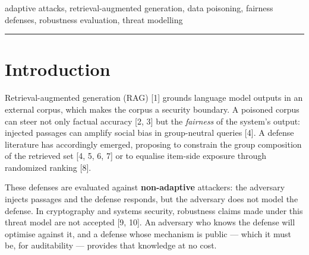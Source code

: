 \documentclass[review,3p,times]{elsarticle}
\begin{document}
\begin{abstract}
\begin{enumerate}
\item
  \textbf{A partial exception, and its limits.} Only the R2 (within-group stance) constraint retains measurable benefit under adaptation, and only at low perturbation strength: on BBQ it holds adversarial inclusion at 0.049--0.319 up to \(\lambda = 0.5\), versus 0.007--0.111 for off-manifold filtering, and it does so while preserving utility. Above \(\lambda = 2\) every defense saturates at 1.000.
\end{enumerate}

The practical implication is that adaptive evaluation changes the conclusion of this literature: static rankings of defense strength are not merely optimistic but \emph{inverted}. We propose a minimal reporting protocol --- an adaptive attacker with a strength sweep --- and argue it should be mandatory for any retrieval-fairness defense claim.

\end{abstract}

\begin{keyword}
 adaptive attacks, retrieval-augmented generation, data poisoning, fairness defenses, robustness evaluation, threat modelling

\begin{center}\rule{0.5\linewidth}{0.5pt}\end{center}

\end{keyword}

\section{Introduction}\label{introduction}

Retrieval-augmented generation (RAG) {[}1{]} grounds language model outputs in an external corpus, which makes the corpus a security boundary. A poisoned corpus can steer not only factual accuracy {[}2, 3{]} but the \emph{fairness} of the system's output: injected passages can amplify social bias in group-neutral queries {[}4{]}. A defense literature has accordingly emerged, proposing to constrain the group composition of the retrieved set {[}4, 5, 6, 7{]} or to equalise item-side exposure through randomized ranking {[}8{]}.

These defenses are evaluated against \textbf{non-adaptive} attackers: the adversary injects passages and the defense responds, but the adversary does not model the defense. In cryptography and systems security, robustness claims made under this threat model are not accepted {[}9, 10{]}. An adversary who knows the defense will optimise against it, and a defense whose mechanism is public --- which it must be, for auditability --- provides that knowledge at no cost.
\end{document}

